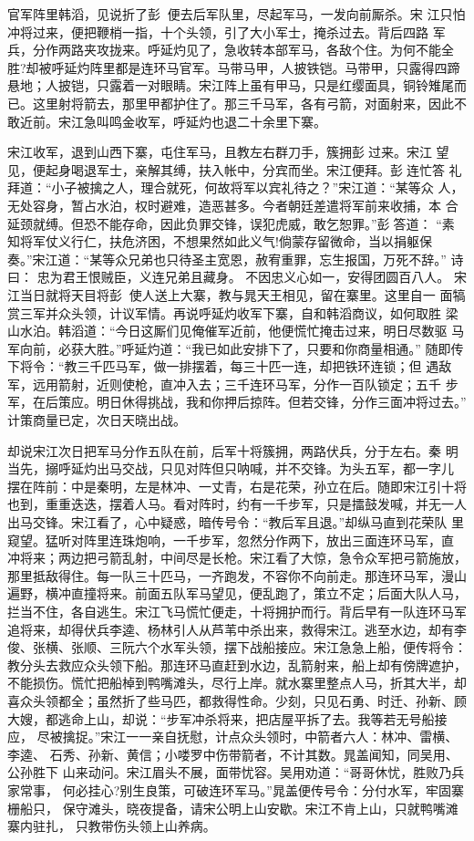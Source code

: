 官军阵里韩滔，见说折了彭，便去后军队里，尽起军马，一发向前厮杀。宋
江只怕冲将过来，便把鞭梢一指，十个头领，引了大小军士，掩杀过去。背后四路
军兵，分作两路夹攻拢来。呼延灼见了，急收转本部军马，各敌个住。为何不能全
胜?却被呼延灼阵里都是连环马官军。马带马甲，人披铁铠。马带甲，只露得四蹄
悬地；人披铠，只露着一对眼睛。宋江阵上虽有甲马，只是红缨面具，铜铃雉尾而
已。这里射将箭去，那里甲都护住了。那三千马军，各有弓箭，对面射来，因此不
敢近前。宋江急叫鸣金收军，呼延灼也退二十余里下寨。

宋江收军，退到山西下寨，屯住军马，且教左右群刀手，簇拥彭过来。宋江
望见，便起身喝退军士，亲解其缚，扶入帐中，分宾而坐。宋江便拜。彭连忙答
礼拜道：“小子被擒之人，理合就死，何故将军以宾礼待之？”宋江道：“某等众
人，无处容身，暂占水泊，权时避难，造恶甚多。今者朝廷差遣将军前来收捕，本
合延颈就缚。但恐不能存命，因此负罪交锋，误犯虎威，敢乞恕罪。”彭答道：
“素知将军仗义行仁，扶危济困，不想果然如此义气!倘蒙存留微命，当以捐躯保
奏。”宋江道：“某等众兄弟也只待圣主宽恩，赦宥重罪，忘生报国，万死不辞。”
诗曰：
忠为君王恨贼臣，义连兄弟且藏身。
不因忠义心如一，安得团圆百八人。
宋江当日就将天目将彭，使人送上大寨，教与晁天王相见，留在寨里。这里自一
面犒赏三军并众头领，计议军情。再说呼延灼收军下寨，自和韩滔商议，如何取胜
梁山水泊。韩滔道：“今日这厮们见俺催军近前，他便慌忙掩击过来，明日尽数驱
马军向前，必获大胜。”呼延灼道：“我已如此安排下了，只要和你商量相通。”
随即传下将令：“教三千匹马军，做一排摆着，每三十匹一连，却把铁环连锁；但
遇敌军，远用箭射，近则使枪，直冲入去；三千连环马军，分作一百队锁定；五千
步军，在后策应。明日休得挑战，我和你押后掠阵。但若交锋，分作三面冲将过去。”
计策商量已定，次日天晓出战。

却说宋江次日把军马分作五队在前，后军十将簇拥，两路伏兵，分于左右。秦
明当先，搦呼延灼出马交战，只见对阵但只呐喊，并不交锋。为头五军，都一字儿
摆在阵前：中是秦明，左是林冲、一丈青，右是花荣，孙立在后。随即宋江引十将
也到，重重迭迭，摆着人马。看对阵时，约有一千步军，只是擂鼓发喊，并无一人
出马交锋。宋江看了，心中疑惑，暗传号令：“教后军且退。”却纵马直到花荣队
里窥望。猛听对阵里连珠炮响，一千步军，忽然分作两下，放出三面连环马军，直
冲将来；两边把弓箭乱射，中间尽是长枪。宋江看了大惊，急令众军把弓箭施放，
那里抵敌得住。每一队三十匹马，一齐跑发，不容你不向前走。那连环马军，漫山
遍野，横冲直撞将来。前面五队军马望见，便乱跑了，策立不定；后面大队人马，
拦当不住，各自逃生。宋江飞马慌忙便走，十将拥护而行。背后早有一队连环马军
追将来，却得伏兵李逵、杨林引人从芦苇中杀出来，救得宋江。逃至水边，却有李
俊、张横、张顺、三阮六个水军头领，摆下战船接应。宋江急急上船，便传将令：
教分头去救应众头领下船。那连环马直赶到水边，乱箭射来，船上却有傍牌遮护，
不能损伤。慌忙把船棹到鸭嘴滩头，尽行上岸。就水寨里整点人马，折其大半，却
喜众头领都全；虽然折了些马匹，都救得性命。少刻，只见石勇、时迁、孙新、顾
大嫂，都逃命上山，却说：“步军冲杀将来，把店屋平拆了去。我等若无号船接应，
尽被擒捉。”宋江一一亲自抚慰，计点众头领时，中箭者六人：林冲、雷横、李逵、
石秀、孙新、黄信；小喽罗中伤带箭者，不计其数。晁盖闻知，同吴用、公孙胜下
山来动问。宋江眉头不展，面带忧容。吴用劝道：“哥哥休忧，胜败乃兵家常事，
何必挂心?别生良策，可破连环军马。”晁盖便传号令：分付水军，牢固寨栅船只，
保守滩头，晓夜提备，请宋公明上山安歇。宋江不肯上山，只就鸭嘴滩寨内驻扎，
只教带伤头领上山养病。

